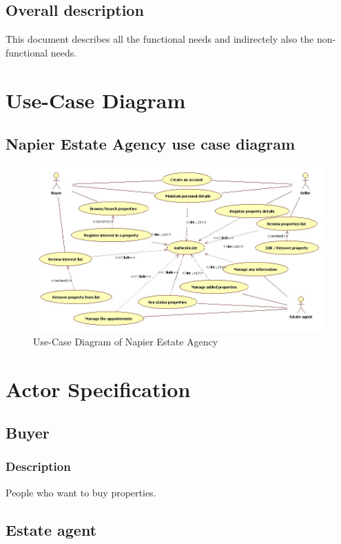 \documentclass[a4paper,12pt]{article}
\begin{document}
\subsection{Overall description}
This document describes all the functional needs and indirectely also the non-functional needs.


\section{Use-Case Diagram}

\subsection{Napier Estate Agency use case diagram}
\begin{figure}[htbp]
\begin{center}
\includegraphics[width=\linewidth]{pics/useCases.jpg}
\end{center}
\caption{\footnotesize Use-Case Diagram of Napier Estate Agency}
\end{figure}


\section{Actor Specification}

\subsection{Buyer}
\subsubsection{Description}
People who want to buy properties.

\subsection{Estate agent}
\end{document}
